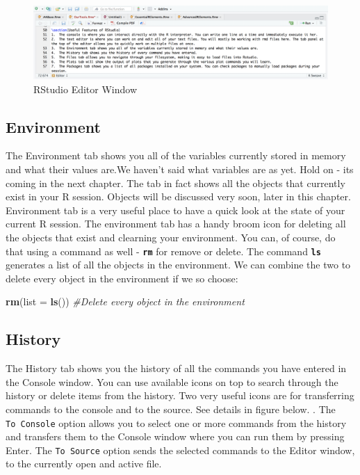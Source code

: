 \documentclass[]{krantz}
\makeatletter
\newenvironment{Shaded}{\begin{snugshade}}{\end{snugshade}}
\newcommand{\KeywordTok}[1]{\textcolor[rgb]{0.27,0.27,0.27}{\textbf{#1}}}
\newcommand{\DataTypeTok}[1]{\textcolor[rgb]{0.27,0.27,0.27}{#1}}
\newcommand{\CommentTok}[1]{\textcolor[rgb]{0.56,0.35,0.01}{\textit{#1}}}
\newcommand{\NormalTok}[1]{#1}
\newenvironment{kframe}{%
\medskip{}
\setlength{\fboxsep}{.8em}
 \def\at@end@of@kframe{}%
 \ifinner\ifhmode%
  \def\at@end@of@kframe{\end{minipage}}%
  \begin{minipage}{\columnwidth}%
 \fi\fi%
 \def\FrameCommand##1{\hskip\@totalleftmargin \hskip-\fboxsep
 \colorbox{shadecolor}{##1}\hskip-\fboxsep
     \hskip-\linewidth \hskip-\@totalleftmargin \hskip\columnwidth}%
 \MakeFramed {\advance\hsize-\width
   \@totalleftmargin\z@ \linewidth\hsize
   \@setminipage}}%
 {\par\unskip\endMakeFramed%
 \at@end@of@kframe}
\renewenvironment{Shaded}{\begin{kframe}}{\end{kframe}}
\theoremstyle{definition}
\theoremstyle{definition}
\theoremstyle{definition}
\theoremstyle{remark}
\makeatother
\begin{document}
\begin{figure}
\centering
\includegraphics{images/editor.png}
\caption{RStudio Editor Window}
\end{figure}

\subsection{Environment}\label{environment}

The Environment tab shows you all of the variables currently stored in
memory and what their values are.We haven't said what variables are as
yet. Hold on - its coming in the next chapter. The tab in fact shows all
the objects that currently exist in your R session. Objects will be
discussed very soon, later in this chapter. Environment tab is a very
useful place to have a quick look at the state of your current R
session. The environment tab has a handy broom icon for deleting all the
objects that exist and clearning your environment. You can, of course,
do that using a command as well - \textbf{\texttt{rm}} for remove or
delete. The command \textbf{\texttt{ls}} generates a list of all the
objects in the environment. We can combine the two to delete every
object in the environment if we so choose:

\begin{Shaded}
\begin{Highlighting}[]
\KeywordTok{rm}\NormalTok{(}\DataTypeTok{list =} \KeywordTok{ls}\NormalTok{()) }\CommentTok{#Delete every object in the environment}
\end{Highlighting}
\end{Shaded}

\subsection{History}\label{history}

The History tab shows you the history of all the commands you have
entered in the Console window. You can use available icons on top to
search through the history or delete items from the history. Two very
useful icons are for transferring commands to the console and to the
source. See details in figure below. . The \texttt{To\ Console} option
allows you to select one or more commands from the history and transfers
them to the Console window where you can run them by pressing Enter. The
\texttt{To\ Source} option sends the selected commands to the Editor
window, to the currently open and active file.
\end{document}
